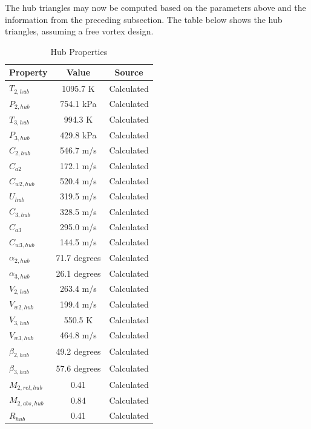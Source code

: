 \documentclass[12pt, letter]{report}
\begin{document}
The hub triangles may now be computed based on the parameters above and the information from the preceding subsection. The table below shows the hub triangles, assuming a free vortex design.

\begin{table}[H]
\caption{Hub Properties}
\centering
\begin{tabular}{|l|c|c|}
\hline
\textbf{Property} & \textbf{Value} & \textbf{Source} \\ \hline
$T_{2,hub}$ & 1095.7 K & Calculated\\ \hline
$P_{2,hub}$ & 754.1 kPa & Calculated\\ \hline
$T_{3,hub}$ & 994.3 K & Calculated\\ \hline
$P_{3,hub}$ & 429.8 kPa & Calculated\\ \hline
$C_{2,hub}$ & 546.7 m/s & Calculated\\ \hline
$C_{a2}$ & 172.1 m/s & Calculated\\ \hline
$C_{w2,hub}$ & 520.4 m/s & Calculated\\ \hline
$U_{hub}$ & 319.5 m/s & Calculated\\ \hline
$C_{3,hub}$ & 328.5 m/s & Calculated\\ \hline
$C_{a3}$ & 295.0 m/s & Calculated\\ \hline
$C_{w3,hub}$ & 144.5 m/s & Calculated\\ \hline
$\alpha_{2,hub}$ & 71.7 degrees & Calculated\\ \hline
$\alpha_{3,hub}$ & 26.1 degrees & Calculated\\ \hline
$V_{2,hub}$ & 263.4 m/s  & Calculated\\ \hline
$V_{w2,hub}$ & 199.4 m/s& Calculated\\ \hline
$V_{3,hub}$ & 550.5 K & Calculated\\ \hline
$V_{w3,hub}$ & 464.8 m/s & Calculated\\ \hline
$\beta_{2,hub}$ & 49.2 degrees& Calculated\\ \hline
$\beta_{3,hub}$ & 57.6 degrees & Calculated\\ \hline
$M_{2,rel,hub}$ & 0.41 & Calculated\\ \hline
$M_{2,abs,hub}$ & 0.84 & Calculated \\ \hline
$R_{hub}$ & 0.41 & Calculated \\ \hline
\end{tabular} 
\label{tab:my_label}
\end{table}
\par
\end{document}
